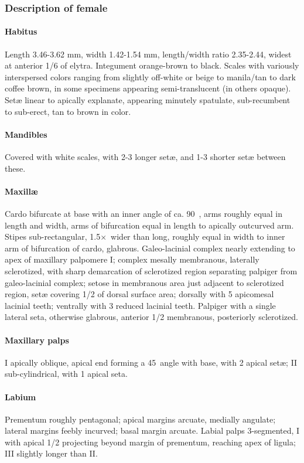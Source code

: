 \documentclass[fleqn,10pt,lineno]{wlpeerj} %
\newcommand{\td}{\textdegree~}
\newcommand{\x}{$\times$~}
\begin{document}
		\subsubsection*{Description of female}
			\paragraph{Habitus}
				Length 3.46-3.62 mm, width 1.42-1.54 mm, length/width ratio 2.35-2.44, widest at anterior 1/6 of elytra.
				Integument orange-brown to black.
				Scales with variously interspersed colors ranging from slightly off-white or beige to manila/tan to dark coffee brown, in some specimens appearing semi-translucent (in others opaque).
				Set{\ae} linear to apically explanate, appearing minutely spatulate, sub-recumbent to sub-erect, tan to brown in color.
			\paragraph{Mandibles}
				Covered with white scales, with 2-3 longer set{\ae}, and 1-3 shorter set{\ae} between these.
			\paragraph{Maxill{\ae}}
				Cardo bifurcate at base with an inner angle of ca. 90\td, arms roughly equal in length and width, arms of bifurcation equal in length to apically outcurved arm. 
				Stipes sub-rectangular, 1.5\x wider than long, roughly equal in width to inner arm of bifurcation of cardo, glabrous. 
				Galeo-lacinial complex nearly extending to apex of maxillary palpomere I; complex mesally membranous, laterally sclerotized, with sharp demarcation of sclerotized region separating palpiger from galeo-lacinial complex; setose in membranous area just adjacent to sclerotized region, set{\ae} covering 1/2 of dorsal surface area; dorsally with 5 apicomesal lacinial teeth; ventrally with 3 reduced lacinial teeth. 
				Palpiger with a single lateral seta, otherwise glabrous, anterior 1/2 membranous, posteriorly sclerotized.
			\paragraph{Maxillary palps}
				I apically oblique, apical end forming a 45\td angle with base, with 2 apical set{\ae}; II sub-cylindrical, with 1 apical seta.
			\paragraph{Labium}
				Prementum roughly pentagonal; apical margins arcuate, medially angulate; lateral margins feebly incurved; basal margin arcuate. 
				Labial palps 3-segmented, I with apical 1/2 projecting beyond margin of prementum, reaching apex of ligula; III slightly
longer than II.
\end{document}
